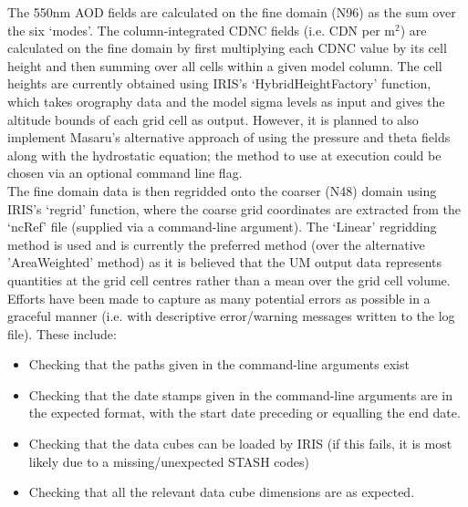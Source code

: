 \documentclass[10pt,a4paper]{article}
\begin{document}
\noindent The 550nm AOD fields are calculated on the fine domain (N96) as the sum over the six `modes'. The column-integrated CDNC fields (i.e. CDN per m$^2$) are calculated on the fine domain by first multiplying each CDNC value by its cell height and then summing over all cells within a given model column. The cell heights are currently obtained using IRIS's `HybridHeightFactory' function, which takes orography data and the model sigma levels as input and gives the altitude bounds of each grid cell as output. However, it is planned to also implement Masaru's alternative approach of using the pressure and theta fields along with the hydrostatic equation; the method to use at execution could be chosen via an optional command line flag.\\

\noindent The fine domain data is then regridded onto the coarser (N48) domain using IRIS's `regrid' function, where the coarse grid coordinates are extracted from the `ncRef' file (supplied via a command-line argument). The `Linear' regridding method is used and is currently the preferred method (over the alternative 'AreaWeighted' method) as it is believed that the UM output data represents quantities at the grid cell centres rather than a mean over the grid cell volume.\\

\noindent Efforts have been made to capture as many potential errors as possible in a graceful manner (i.e. with descriptive error/warning messages written to the log file). These include:
\begin{itemize}
\item Checking that the paths given in the command-line arguments exist
\item Checking that the date stamps given in the command-line arguments are in the expected format, with the start date preceding or equalling the end date.
\item Checking that the data cubes can be loaded by IRIS (if this fails, it is most likely due to a missing/unexpected STASH codes)
\item Checking that all the relevant data cube dimensions are as expected.
\end{itemize}
\end{document}
